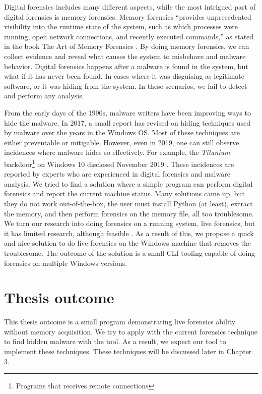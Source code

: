 Digital forensics includes many different aspects, while the most intrigued
part of digital forensics is memory forensics. Memory forensics ``provides
unprecedented visibility into the runtime state of the system, such as which
processes were running, open network connections, and recently executed
commands,'' as stated in the book The Art of Memory Forensics
\cite{ligh2014art}. By doing memory forensics, we can collect evidence and
reveal what causes the system to misbehave and malware behavior.  Digital
forensics happens after a malware is found in the system, but what if it has
never been found. In cases where it was disguising as legitimate software, or
it was hiding from the system. In these scenarios, we fail to detect and
perform any analysis.

From the early days of the 1990s, malware writers have been improving ways to
hide the malware. In 2017, a small report \cite{evolutionHidding} has revised
on hiding techniques used by malware over the years in the Windows OS. Most of
these techniques are either preventable or mitigable. However, even in 2019,
one can still observe incidences where malware hides so effectively. For
example, the \textit{Titanium} backdoor\footnote{Programs that receives remote
connections} on Windows 10 disclosed November 2019 \cite{titanium}. These
incidences are reported by experts who are experienced in digital forensics and
malware analysis. We tried to find a solution where a simple program can
perform digital forensics and report the current machine status. Many solutions
came up, but they do not work out-of-the-box, the user must install Python (at
least), extract the memory, and then perform forensics on the memory file, all
too troublesome. We turn our research into doing forensics on a running system,
live forensics, but it has limited research, although feasible
\cite{reviewLive}. As a result of this, we propose a quick and nice solution to
do live forensics on the Windows machine that removes the troublesome. The
outcome of the solution is a small CLI tooling capable of doing forensics on
multiple Windows versions.

\section[Thesis outcome]{Thesis outcome}

This thesis outcome is a small program demonstrating live forensics ability
without memory acquisition. We try to apply with the current forensics
technique to find hidden malware with the tool. As a result, we expect our tool
to implement these techniques. These techniques will be discussed later in
Chapter 3.

